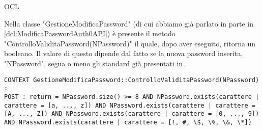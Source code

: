\begin{listaPersonale}{OCL}
    \begin{center}
        
    \end{center}
    Nella classe "GestioneModificaPassword" (di cui abbiamo già parlato in parte in \ref{dcl:ModificaPasswordAuth0API}) è presente il metodo\\ "ControlloValiditaPassword(NPassword)" il quale, dopo aver eseguito, ritorna un booleano. Il valore di questo dipende dal fatto se la nuova password inserita, "NPassword", segua o meno gli standard già presentati in .
    \begin{lstlisting}
CONTEXT GestioneModificaPassword::ControlloValiditaPassword(NPassword) :
POST : return = NPassword.size() >= 8 AND NPassword.exists(carattere | carattere = [a, ..., z]) AND NPassword.exists(carattere | carattere = [A, ..., Z]) AND NPassword.exists(carattere | carattere = [0, ..., 9]) AND NPassword.exists(carattere | carattere = [!, #, \$, \%, \&, \*])
    \end{lstlisting}
    \newpage


\end{listaPersonale}
